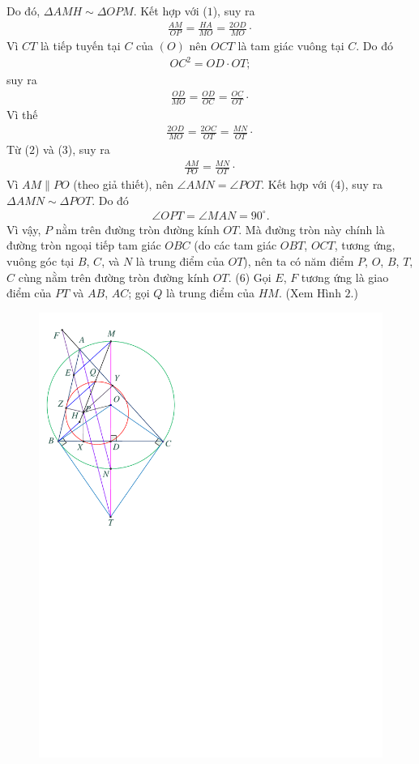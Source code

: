 \begin{multicols}{2}
	Do đó, $\Delta AMH \sim \Delta OPM$. Kết hợp với ($1$), suy ra
	\begin{align*}
		\frac{{AM}}{{OP}} = \frac{{HA}}{{MO}} = \frac{{2OD}}{{MO}} \cdot \tag{$2$}
	\end{align*}
	Vì $CT$ là tiếp tuyến tại $C$ của $(O)$ nên $OCT$ là tam giác vuông tại $C$. Do đó
	\begin{align*}
		O{C^2} = OD \cdot OT;
	\end{align*}
	suy ra
	\begin{align*}
		\frac{{OD}}{{MO}} = \frac{{OD}}{{OC}} = \frac{{OC}}{{OT}} \cdot
	\end{align*}
	Vì thế
	\begin{align*}
		\frac{{2OD}}{{MO}} = \frac{{2OC}}{{OT}} = \frac{{MN}}{{OT}} \cdot \tag{$3$}
	\end{align*}
	Từ ($2$) và ($3$), suy ra
	\begin{align*}
		\frac{{AM}}{{PO}} = \frac{{MN}}{{OT}} \cdot \tag{$4$}
	\end{align*}
	Vì $AM \parallel PO$ (theo giả thiết), nên \linebreak$\angle AMN = \angle POT$.  Kết hợp với ($4$), suy ra $\Delta AMN \sim  \Delta POT$. Do đó
	\begin{align*}
		\angle OPT = \angle MAN = 90^\circ. \tag{$5$}
	\end{align*}
	Vì vậy, $P$ nằm trên đường tròn đường kính $OT$. Mà đường tròn này chính là đường tròn ngoại tiếp tam giác $OBC$ (do các tam giác $OBT$, $OCT$, tương ứng, vuông góc tại $B$, $C$, và $N$ là trung điểm của $OT$), nên ta có năm điểm $P$, $O$, $B$, $T$, $C$ cùng nằm trên đường tròn đường kính $OT$. \hfill                                            ($6$)
	\vskip 0.05cm
	Gọi $E$, $F$ tương ứng là giao điểm của $PT$ và $AB$, $AC$; gọi $Q$ là trung điểm của $HM$. (Xem Hình $2$.)
	\begin{figure}[H]
		\centering
		\vspace*{-10pt}
		\captionsetup{labelformat= empty, justification=centering}
		\includegraphics[width=0.7\linewidth]{P619H2}

\end{figure}
\end{multicols}
